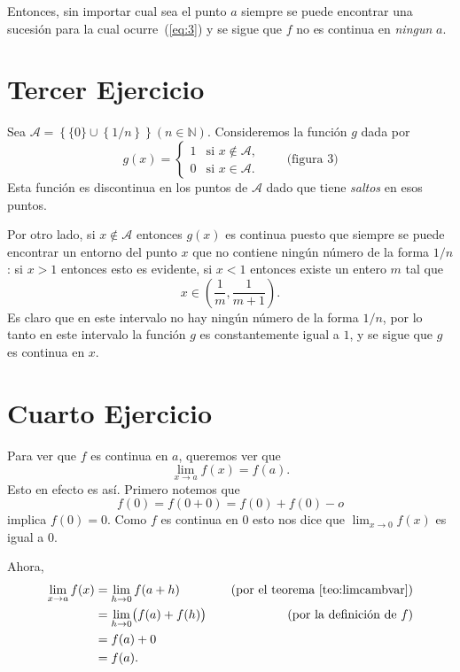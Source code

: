 \documentclass[fleqn,leqno,12pt,letterpaper,final]{article}
\begin{document}
Entonces, sin importar cual sea el punto $a$ siempre se puede encontrar una
sucesión para la cual ocurre~(\ref{eq:3}) y se sigue que $f$ no es continua en \emph{ningun} $a$.


\section{Tercer Ejercicio}%
Sea $\mathcal{A}=\left\{ \{0\}\cup \left\{ 1/n \right\} \right\}(n\in\mathbb{N})$. Consideremos la función $g$ dada por 
\[
	g(x)=\begin{cases}
		1 &\text{si $x\notin \mathcal{A}$},\\
		0 &\text{si $x\in\mathcal{A}$}.
	\end{cases}\qquad\text{(figura 3)}
\]
Esta función es discontinua en los puntos de $\mathcal{A}$ dado que tiene \emph{saltos} en
esos puntos.%

 Por otro lado, si $x\notin\mathcal{A}$ entonces $g(x)$ es continua puesto que 
siempre se puede encontrar un entorno del punto $x$ que no contiene ningún
número de la forma $1/n$: si $x>1$ entonces esto es evidente, si $x<1$ entonces existe un entero $m$ tal que
\[
	x\in\left(\frac 1m, \frac{1}{m+1} \right).
\]
Es claro que en este intervalo no hay ningún número de la forma $1/n$, por lo tanto en este
intervalo la función $g$ es constantemente igual a $1$, y se sigue que $g$ es continua en $x$.

\section{Cuarto Ejercicio}%
Para ver que $f$ es continua en $a$, queremos ver que
\[
	\lim_{x\to a} f(x)=f(a).
\]
Esto en efecto es así. Primero notemos que
\[
	f(0)=f(0+0)=f(0)+f(0)-o
\]
implica $f(0)=0$. Como $f$ es continua en $0$ esto nos dice que
$ \lim_{x\to0} f(x)$ es igual a $0$.

Ahora,
\allowdisplaybreaks
\begin{align*}
	\lim_{x\to a} f(x) &= \lim_{h\to 0} f(a+h)&\quad\text{(por el teorema~\ref{teo:limcambvar})}\\
			   &= \lim_{h\to 0} \bigl(f(a)+f(h)\bigr)&\quad\text{(por la definición de $f$)}\\
			   &=f(a)+0&\\
			   &=f(a).&
\end{align*}
	
\end{document}
